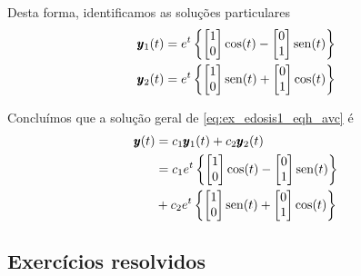 \begin{ex}
  Desta forma, identificamos as soluções particulares
  \begin{align}
    \pmb{y}_1(t) &= e^t\left\{
    \begin{bmatrix}
      1\\
      0
    \end{bmatrix}\cos(t) -
    \begin{bmatrix}
      0\\
      1
    \end{bmatrix}\operatorname{sen}(t)\right\}\\
    \pmb{y}_2(t) &= e^t\left\{
    \begin{bmatrix}
      1\\
      0
    \end{bmatrix}\operatorname{sen}(t) +
    \begin{bmatrix}
      0\\
      1
    \end{bmatrix}\cos(t)\right\}
  \end{align}

  Concluímos que a solução geral de \eqref{eq:ex_edosis1_eqh_avc} é
  \begin{align}
    \pmb{y}(t) &= c_1\pmb{y}_1(t) + c_2\pmb{y}_2(t) \\
    &= c_1e^t\left\{
    \begin{bmatrix}
      1\\
      0
    \end{bmatrix}\cos(t) -
    \begin{bmatrix}
      0\\
      1
    \end{bmatrix}\operatorname{sen}(t)\right\} \\
    &+ c_2e^t\left\{
    \begin{bmatrix}
      1\\
      0
    \end{bmatrix}\operatorname{sen}(t) +
    \begin{bmatrix}
      0\\
      1
    \end{bmatrix}\cos(t)\right\}
  \end{align}
\end{ex}

\subsection*{Exercícios resolvidos}

